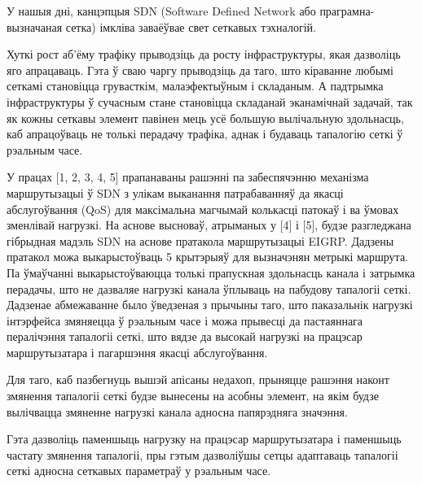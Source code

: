 \sectionWithoutNumber{\prefacename}

У нашыя дні, канцэпцыя SDN (Software Defined Network або праграмна-вызначаная сетка)
імкліва заваёўвае свет сеткавых тэхналогій.

Хуткі рост аб'ёму трафіку прыводзіць да росту інфраструктуры, якая
дазволіць яго апрацаваць. Гэта ў сваю чаргу прыводзіць да таго, што кіраванне
любымі сеткамі становіцца грувасткім, малаэфектыўным і складаным.
А падтрымка інфраструктуры ў сучасным стане становіцца складанай эканамічнай задачай,
так як кожны сеткавы элемент павінен мець усё большую вылічальную здольнасць, каб
апрацоўваць не толькі перадачу трафіка, аднак і будаваць тапалогію сеткі ў рэальным часе.

У працах [1, 2, 3, 4, 5] прапанаваны рашэнні па забеспячэнню механізма
маршрутызацыі ў SDN з улікам выканання патрабаванняў да якасці абслугоўвання
(QoS) для максімальна магчымай колькасці патокаў і ва ўмовах зменлівай нагрузкі.
На аснове высноваў, атрыманых у [4] і [5], будзе разгледжана гібрыдная мадэль
SDN на аснове пратакола маршрутызацыі EIGRP.
Дадзены пратакол можа выкарыстоўваць 5 крытэрыяў для вызначэнян метрыкі маршрута.
Па ўмаўчанні выкарыстоўваюцца толькі прапускная здольнасць канала і затрымка перадачы,
што не дазваляе нагрузкі канала ўплываць на пабудову тапалогіі сеткі.
Дадзенае абмежаванне было ўведзеная з прычыны таго, што паказальнік нагрузкі інтэрфейса
змяняецца ў рэальным часе і можа прывесці да пастаяннага пералічэння тапалогіі сеткі, што
вядзе да высокай нагрузкі на працэсар маршрутызатара і пагаршэння якасці абслугоўвання.

Для таго, каб пазбегнуць вышэй апісаны недахоп, прыняцце рашэння наконт змянення тапалогіі сеткі
будзе вынесены на асобны элемент, на якім будзе вылічвацца змяненне нагрузкі канала адносна
папярэдняга значэння.

Гэта дазволіць паменшыць нагрузку на працэсар маршрутызатара і паменшыць частату змянення
тапалогіі, пры гэтым дазволіўшы сетцы адаптаваць тапалогіі сеткі адносна сеткавых параметраў
у рэальным часе.

\clearpage
